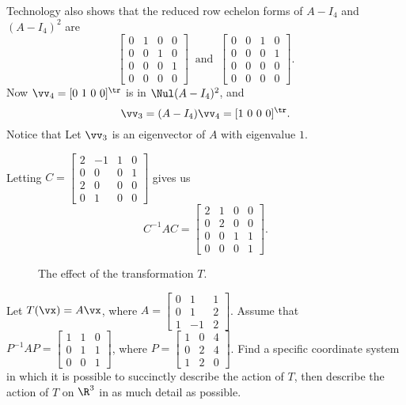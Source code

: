 Technology also shows that the reduced row echelon forms of $A-I_4$ and $(A-I_4)^2$ are 
\[\left[ \begin{array}{cccc} 0&1&0&0 \\ 0&0&1&0 \\ 0&0&0&1 \\ 0&0&0&0 \end{array} \right] \ \text{ and } \ \left[ \begin{array}{cccc} 0&0&1&0 \\ 0&0&0&1 \\ 0&0&0&0 \\ 0&0&0&0 \end{array} \right].\]
Now $\vv_4 = [0 \ 1 \ 0 \ 0]^{\tr}$ is in $\Nul (A-I_4)^2$, and 
\[\vv_3 = (A-I_4)\vv_4 = [1 \ 0 \ 0 \ 0]^{\tr}.\]
Notice that  Let $\vv_3$ is an eigenvector of $A$ with eigenvalue $1$. 

Letting $C = \left[ \begin{array}{crcc} 2&-1&1&0 \\ 0&0&0&1 \\ 2&0&0&0 \\ 0&1&0&0 \end{array} \right]$ gives us 
\[C^{-1}AC = \left[ \begin{array}{cccc} 2&1&0&0 \\ 0&2&0&0 \\ 0&0&1&1 \\ 0&0&0&1 \end{array} \right].\]


\ea

\begin{figure}[ht]
\begin{center}
\end{center}
\caption{The effect of the transformation $T$.}
\label{F:JCF_example_3_d}
\end{figure}
\begin{example} Let $T(\vx) = A\vx$, where $A = \left[ \begin{array}{crc} 0&1&1 \\ 0&1&2 \\ 1&-1&2 \end{array} \right]$. Assume that $P^{-1}AP = \left[ \begin{array}{ccc} 1&1&0 \\ 0&1&1 \\ 0&0&1 \end{array} \right]$, where $P = \left[ \begin{array}{ccc} 1&0&4 \\ 0&2&4 \\ 1&2&0 \end{array} \right]$. Find a specific coordinate system in which it is possible to succinctly describe the action of $T$, then describe the action of $T$ on $\R^3$ in as much detail as possible. 

\ExampleSolution

\end{example}

